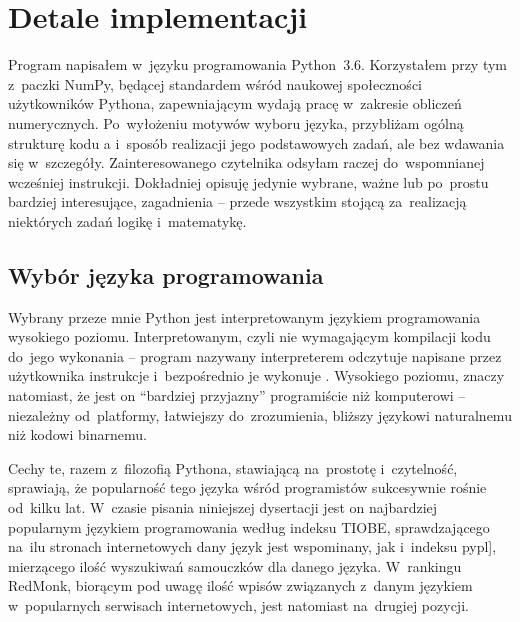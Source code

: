 \section{Detale implementacji}\label{tesliper:implementation}
Program \tesliper{} napisałem w~języku programowania Python~3.6.
Korzystałem przy tym z~paczki NumPy, będącej standardem wśród naukowej społeczności
  użytkowników Pythona, zapewniającym wydają pracę w~zakresie obliczeń numerycznych.
Po~wyłożeniu motywów wyboru języka, przybliżam ogólną strukturę kodu \tesliper{}a
  i~sposób realizacji jego podstawowych zadań, ale bez wdawania się w~szczegóły.
Zainteresowanego czytelnika odsyłam raczej do~wspomnianej wcześniej instrukcji.
Dokładniej opisuję jedynie wybrane, ważne lub po~prostu bardziej interesujące, zagadnienia
  \--- przede wszystkim stojącą za~realizacją niektórych zadań logikę i~matematykę.

\subsection{Wybór języka programowania}\label{implementation:language}
Wybrany przeze mnie Python jest interpretowanym językiem programowania wysokiego poziomu.
Interpretowanym, czyli nie wymagającym kompilacji kodu do~jego wykonania \--- program nazywany
  interpreterem odczytuje napisane przez użytkownika instrukcje i~bezpośrednio je wykonuje%
  .
Wysokiego poziomu, znaczy natomiast, że jest on \enquote{bardziej przyjazny} programiście
  niż komputerowi \--- niezależny od~platformy, łatwiejszy do~zrozumienia, bliższy językowi
  naturalnemu niż kodowi binarnemu.

Cechy te, razem z~filozofią Pythona, stawiającą na~prostotę i~czytelność, sprawiają,
  że popularność tego języka wśród programistów sukcesywnie rośnie od~kilku lat.
W~czasie pisania niniejszej dysertacji jest on najbardziej popularnym językiem programowania
  według indeksu TIOBE, sprawdzającego na~ilu stronach internetowych dany
  język jest wspominany, jak i~indeksu \gls{pypl}], mierzącego ilość
  wyszukiwań samouczków dla danego języka.
W~rankingu RedMonk, biorącym pod uwagę ilość wpisów związanych z~danym
  językiem w~popularnych serwisach internetowych, jest natomiast na~drugiej pozycji.

